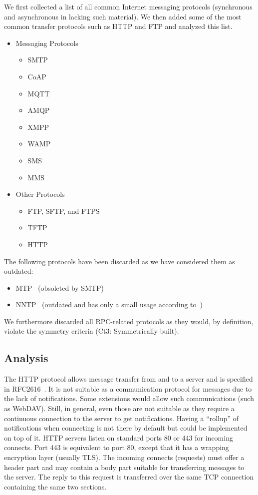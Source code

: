 We first collected a list of all common Internet messaging protocols (synchronous and asynchronous in lacking such material). We then added some of the most common transfer protocols such as HTTP and FTP and analyzed this list.

\begin{itemize}
	\item Messaging Protocols
	\begin{itemize}
		\item SMTP
		\item CoAP
		\item MQTT
		\item AMQP
		\item XMPP
		\item WAMP
		\item SMS
		\item MMS
	\end{itemize}
	\item Other Protocols
	\begin{itemize}
		\item FTP, SFTP, and FTPS
		\item TFTP
		\item HTTP
	\end{itemize}
\end{itemize}

The following protocols have been discarded as we have considered them as outdated:
\begin{itemize}
	\item MTP~\cite{rfc780} (obsoleted by SMTP)
	\item NNTP~\cite{rfc3977} (outdated and has only a small usage according to~\cite{kim2010today})
\end{itemize}

We furthermore discarded all RPC-related protocols as they would, by definition, violate the symmetry criteria (Ct3: Symmetrically built).

\subsection{Analysis}
The HTTP protocol allows message transfer from and to a server and is specified in RFC2616~\cite{rfc2616}. It is not suitable as a communication protocol for messages due to the lack of notifications. Some extensions would allow such communications (such as WebDAV). Still, in general, even those are not suitable as they require a continuous connection to the server to get notifications. Having a ``rollup'' of notifications when connecting is not there by default but could be implemented on top of it. HTTP servers listen on standard ports 80 or 443 for incoming connects. Port 443 is equivalent to port 80, except that it has a wrapping encryption layer (usually TLS). The incoming connects (requests) must offer a header part and may contain a body part suitable for transferring messages to the server. The reply to this request is transferred over the same TCP connection containing the same two sections.


